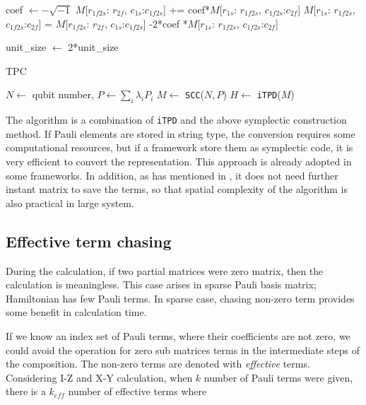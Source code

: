 \documentclass[twocolumn]{article}
\begin{document}
\begin{algorithm}
\begin{algorithmic}
                \State coef $\gets - \sqrt{-1}$ 
                \State $M$[$r_{1f2s}$: $r_{2f}$, $c_{1s}$:$c_{1f2s}$] += coef*$M$[$r_{1s}$: $r_{1f2s}$, $c_{1f2s}$:$c_{2f}$]
                \State $M$[$r_{1s}$: $r_{1f2s}$, $c_{1f2s}$:$c_{2f}$] = $M$[$r_{1f2s}$: $r_{2f}$, $c_{1s}$:$c_{1f2s}$] -2*coef *$M$[$r_{1s}$: $r_{1f2s}$, $c_{1f2s}$:$c_{2f}$]
                
                \EndFor
            \EndFor
            \State unit\_size $\gets$ 2*unit\_size
        \EndFor
    \end{algorithmic}
\end{algorithm}

\begin{algorithm}
    \caption{TPC}\label{alg:TPC}
    \begin{algorithmic}
        \Require $N \gets$ qubit number, $P \gets \sum_i \lambda_i P_i$
        \State $M \gets$ \texttt{SCC}($N, P$)%
        \State $H \gets$ \texttt{iTPD}($M$)%
    \end{algorithmic}
\end{algorithm}

The algorithm is a combination of \texttt{iTPD} and the above symplectic construction
method. If Pauli elements are stored in string type, the conversion requires 
some computational resources, but if a framework store them as symplectic code,
it is very efficient to convert the representation. 
This approach is already adopted in some frameworks\cite{dion2024efficientlymanipulatingpaulistrings}\cite{kim_opttrot}.
In addition, as has mentioned in \cite{Hantzko_2024}, it does not need further 
instant matrix to save the terms, so that spatial complexity of the algorithm is also practical 
in large system.

\subsection{Effective term chasing}

During the calculation, if two partial matrices were zero matrix, then 
the calculation is meaningless. This case arises in sparse Pauli basis matrix; 
Hamiltonian has few Pauli terms.
In sparse case, chasing non-zero term provides some benefit in calculation time.

If we know an index set of Pauli terms, where their coefficients are not zero,
we could avoid the operation for zero sub matrices terms in the intermediate steps of the composition.
The non-zero terms are denoted with \textit{effective} terms. 
Considering I-Z and X-Y calculation, when $k$ number of Pauli terms were given, 
there is a $k_{eff}$ number of effective terms where
\end{document}
